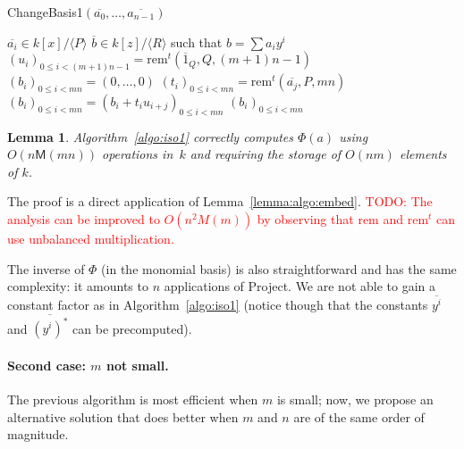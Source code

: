 \documentclass[12pt]{article}
\def\M {\ensuremath{\mathsf{M}}}
\def\rem {\ensuremath{\mathrm{rem}}}
\newcommand{\ang}[1]{\langle#1\rangle}
\newcommand{\dual}[1]{\overline{#1}}
\newcommand{\todo}[1]{\textcolor{red}{TODO: #1}}
\newtheorem{Lemma}{Lemma}
\begin{document}
\begin{algorithm}[H]
  \caption{ChangeBasis1$(\dual{a_0}, \dots, \dual{a_{n-1}})$}
  \begin{algorithmic}[1]
    \REQUIRE $\dual{a_i}\in k[x]/\ang{P}$
    \ENSURE $\dual{b}\in k[z]/\ang{R}$ such that $b = \sum a_iy^i$
    \STATE $(u_i)_{0\le i < (m+1)n-1} = \rem^t(\dual{1}_Q,Q,(m+1)n-1)$
    \STATE $(b_i)_{0\le i < mn} = (0,\dots,0)$
    \STATE $(t_i)_{0\le i < mn} = \rem^t(\dual{a_j},P,mn)$
    \STATE $(b_i)_{0\le i < mn} = (b_i + t_iu_{i+j})_{0\le i < mn}$
    \ENDFOR
    \RETURN $(b_i)_{0\le i <mn}$
  \end{algorithmic}
  \label{algo:iso1}
\end{algorithm}

\begin{Lemma}
  Algorithm~\ref{algo:iso1} correctly computes $\Phi(a)$ using
  $O(n\M(mn))$ operations in~$k$ and requiring the storage of $O(nm)$
  elements of $k$.
\end{Lemma}

The proof is a direct application of
Lemma~\ref{lemma:algo:embed}. \todo{The analysis can be improved to
  $O(n^2M(m))$ by observing that $\rem$ and $\rem^t$ can use
  unbalanced multiplication.}

The inverse of $\Phi$ (in the monomial basis) is also straightforward
and has the same complexity: it amounts to $n$ applications of
Project. We are not able to gain a constant factor as in
Algorithm~\ref{algo:iso1} (notice though that the constants
$\dual{y^i}$ and $\dual{(y^i)^\ast}$ can be precomputed).


\paragraph{Second case: $m$ not small.}
The previous algorithm is most efficient when $m$ is small; now, we
propose an alternative solution that does better when $m$ and $n$ are
of the same order of magnitude. 
\end{document}
